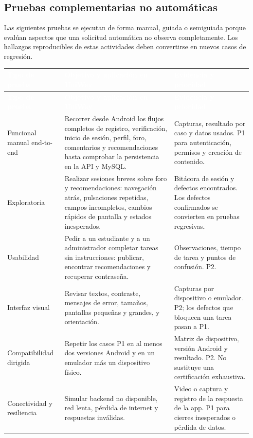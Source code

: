 \documentclass[11pt,a4paper]{article}
\newcommand{\thead}[1]{\textcolor{white}{\textbf{#1}}}
\begin{document}
\subsection{Pruebas complementarias no automáticas}
Las siguientes pruebas se ejecutan de forma manual, guiada o semiguiada porque evalúan aspectos que una solicitud automática no observa completamente. Los hallazgos reproducibles de estas actividades deben convertirse en nuevos casos de regresión.

\begin{longtable}{p{3.0cm}p{7.0cm}p{5.0cm}}
\rowcolor{uniwayblue}\thead{Tipo de prueba} & \thead{Objetivo y aplicación en UniWay} & \thead{Evidencia y prioridad}\\
\endfirsthead
\rowcolor{uniwayblue}\thead{Tipo de prueba} & \thead{Objetivo y aplicación en UniWay} & \thead{Evidencia y prioridad}\\
\endhead
Funcional manual end-to-end & Recorrer desde Android los flujos completos de registro, verificación, inicio de sesión, perfil, foro, comentarios y recomendaciones hasta comprobar la persistencia en la API y MySQL. & Capturas, resultado por caso y datos usados. P1 para autenticación, permisos y creación de contenido.\\
\rowcolor{lightgray}Exploratoria & Realizar sesiones breves sobre foro y recomendaciones: navegación atrás, pulsaciones repetidas, campos incompletos, cambios rápidos de pantalla y estados inesperados. & Bitácora de sesión y defectos encontrados. Los defectos confirmados se convierten en pruebas regresivas.\\
Usabilidad & Pedir a un estudiante y a un administrador completar tareas sin instrucciones: publicar, encontrar recomendaciones y recuperar contraseña. & Observaciones, tiempo de tarea y puntos de confusión. P2.\\
\rowcolor{lightgray}Interfaz visual & Revisar textos, contraste, mensajes de error, tamaños, pantallas pequeñas y grandes, y orientación. & Capturas por dispositivo o emulador. P2; los defectos que bloqueen una tarea pasan a P1.\\
Compatibilidad dirigida & Repetir los casos P1 en al menos dos versiones Android y en un emulador más un dispositivo físico. & Matriz de dispositivo, versión Android y resultado. P2. No sustituye una certificación exhaustiva.\\
\rowcolor{lightgray}Conectividad y resiliencia & Simular backend no disponible, red lenta, pérdida de internet y respuestas inválidas. & Video o captura y registro de la respuesta de la app. P1 para cierres inesperados o pérdida de datos.\\

\end{longtable}
\end{document}
